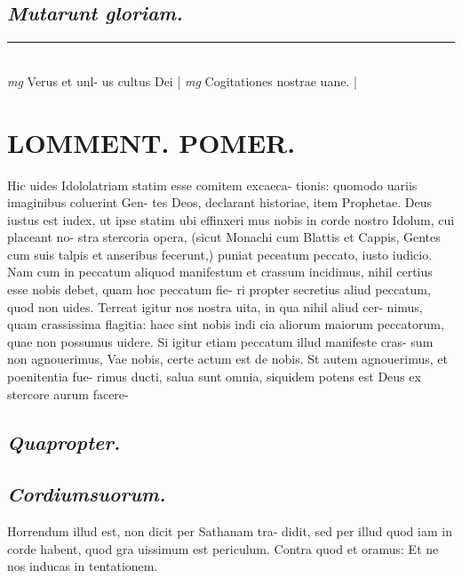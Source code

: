 \documentclass{article}
\begin{document}
\begin{pages}
\subsection*{\textit{Mutarunt gloriam. }}
\vspace{0.5cm}\noindent
\vspace{0.2cm}\rule{1cm}{0.2pt}\\ 
\hspace{0.2cm}\textit{mg}
\footnotesize Verus et unl- us cultus Dei 
\normalsize| 
\hspace{0.2cm}\textit{mg}
\footnotesize Cogitationes nostrae uane. 
\normalsize| 
\section*{LOMMENT. POMER. }\pstart Hic uides Idololatriam statim esse comitem excaeca- tionis: quomodo uariis imaginibus coluerint Gen- tes Deos, declarant historiae, item Prophetae.  \pend\pstart Deus iustus est iudex, ut ipse statim ubi effinxeri mus nobis in corde nostro Idolum, cui placeant no- stra stercoria opera, (sicut Monachi cum Blattis et Cappis, Gentes cum suis talpis et anseribus fecerunt,) puniat peceatum peccato, iusto iudicio. Nam cum in peccatum aliquod manifestum et crassum incidimus, nihil certius esse nobis debet, quam hoc peccatum fie- ri propter secretius aliud peccatum, quod non uides.  Terreat igitur nos nostra uita, in qua nihil aliud cer- nimus, quam crassissima flagitia: haec sint nobis indi cia aliorum maiorum peccatorum, quae non possumus uidere. Si igitur etiam peccatum illud manifeste cras- sum non agnouerimus, Vae nobis, certe actum est de nobis. St autem agnouerimus, et poenitentia fue- rimus ducti, salua sunt omnia, siquidem potens est Deus ex stercore aurum facere-  \pend
{}
{}
\subsection*{\textit{Quapropter. }}
{}
\subsection*{\textit{Cordiumsuorum. }}\pstart Horrendum illud est, non dicit per Sathanam tra- didit, sed per illud quod iam in corde habent, quod gra uissimum est periculum. Contra quod et oramus: Et ne nos inducas in tentationem.   \pend
{}
{}

\end{pages}
\end{document}
